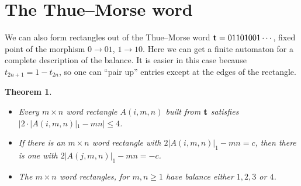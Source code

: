 \documentclass[final]{dmtcs-episciences}
\theoremstyle{plain}
\newtheorem{theorem}{Theorem}
\theoremstyle{remark}
\begin{document}
\section{The Thue--Morse word}

We can also form rectangles out of the
Thue--Morse word
${\bf t} = 01101001\cdots$, fixed point of the morphism $0 \rightarrow 01$, $1 \rightarrow 10$.
Here we can get a finite automaton for a complete description of the balance.  It is easier in this case because $t_{2n+1} = 1-t_{2n}$, so one can ``pair up'' entries except at the edges of the rectangle.

\begin{theorem}
\leavevmode
\begin{itemize}
\item[(a)] Every $m \times n$ word rectangle $A(i,m,n)$  built from $\bf t$ satisfies $|2 \cdot |A(i,m,n)|_1 -mn| \leq 4$.
\item[(b)] If there is an $m \times n$ word rectangle with
$2|A(i,m,n)|_1 - mn = c$, then there is one with
$2|A(j,m,n)|_1 - mn = -c$.
\item[(c)] The $m \times n$ word rectangles, for $m, n\geq 1$ have balance
either $1,2,3$ or $4$.
\end{itemize}
\end{theorem}
\end{document}
